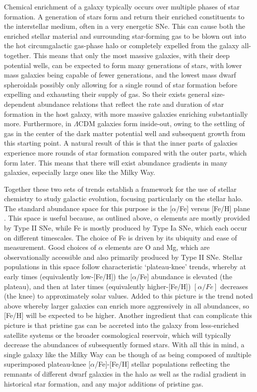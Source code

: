 Chemical enrichment of a galaxy typically occurs over multiple phases of star formation. A generation of stars form and return their enriched constituents to the interstellar medium, often in a very energetic SNe. This can cause both the enriched stellar material and surrounding star-forming gas to be blown out into the hot circumgalactic gas-phase halo or completely expelled from the galaxy all-together. This means that only the most massive galaxies, with their deep potential wells, can be expected to form many generations of stars, with lower mass galaxies being capable of fewer generations, and the lowest mass dwarf spheroidals possibly only allowing for a single round of star formation before expelling and exhausting their supply of gas. So their exists general size-dependent abundance relations that reflect the rate and duration of star formation in the host galaxy, with more massive galaxies enriching substantially more. Furthermore, in $\Lambda$CDM galaxies form inside-out, owing to the settling of gas in the center of the dark matter potential well and subsequent growth from this starting point. A natural result of this is that the inner parts of galaxies experience more rounds of star formation compared with the outer parts, which form later. This means that there will exist abundance gradients in many galaxies, especially large ones like the Milky Way.

Together these two sets of trends establish a framework for the use of stellar chemistry to study galactic evolution, focusing particularly on the stellar halo. The standard abundance space for this purpose is the [$\alpha$/Fe] versus [Fe/H] plane \parencite[e.g.][]{hawkins15}. This space is useful because, as outlined above, $\alpha$ elements are mostly provided by Type II SNe, while Fe is mostly produced by Type Ia SNe, which each occur on different timescales. The choice of Fe is driven by its ubiquity and ease of measurement. Good choices of $\alpha$ elements are O and Mg, which are observationally accessible and also primarily produced by Type II SNe. Stellar populations in this space follow characteristic `plateau-knee' trends, whereby at early times (equivalently low-[Fe/H]) the [$\alpha$/Fe] abundance is elevated (the plateau), and then at later times (equivalently higher-[Fe/H]) $[\alpha/Fe]$ decreases (the knee) to approximately solar values. Added to this picture is the trend noted above whereby larger galaxies can enrich more aggressively in all abundances, so [Fe/H] will be expected to be higher. Another ingredient that can complicate this picture is that pristine gas can be accreted into the galaxy from less-enriched satellite systems or the broader cosmological reservoir, which will typically decrease the abundances of subsequently formed stars. With all this in mind, a single galaxy like the Milky Way can be though of as being composed of multiple superimposed plateau-knee [$\alpha$/Fe]-[Fe/H] stellar populations reflecting the remnants of different dwarf galaxies in the halo as well as the radial gradient in historical star formation, and any major additions of pristine gas. 

